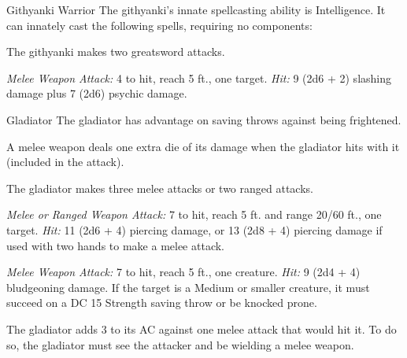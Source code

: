 \documentclass[10pt,a4paper,twoside,bg=print,twocolumn,openany,nodeprecatedcode]{dndbook}
\begin{document}
\begin{DndMonster}[float=t]{Githyanki Warrior}
\DndMonsterBasics[
armor-class = {17 (\textit{half plate armor})},
hit-points = {\DndDice{9d8 + 9}},
speed = {30 ft.}
]
\DndMonsterAbilityScores[
 str = 15,
 dex = 14,
 con = 12,
 int = 13,
 wis = 13,
 cha = 10
]
\DndMonsterDetails[
saving-throws = {Con +3, Int +3, Wis +3},
languages = {Gith},
challenge = 3,
]
The githyanki's innate spellcasting ability is Intelligence. It can innately cast the following spells, requiring no components:
\begin{DndMonsterSpells}
\end{DndMonsterSpells}
The githyanki makes two greatsword attacks.

\textsl{Melee Weapon Attack:} 4 to hit, reach 5 ft., one target. \textsl{Hit:} 9 (2d6 + 2) slashing damage plus 7 (2d6) psychic damage.

\end{DndMonster}



\begin{DndMonster}[float=t]{Gladiator}
\DndMonsterBasics[
armor-class = {16 (studded leather armor)},
hit-points = {\DndDice{15d8 + 45}},
speed = {30 ft.}
]
\DndMonsterAbilityScores[
 str = 18,
 dex = 15,
 con = 16,
 int = 10,
 wis = 12,
 cha = 15
]
\DndMonsterDetails[
saving-throws = {Str +7, Dex +5, Con +6},
skills = {Athletics +10, Intimidation +5},
languages = {any one language (usually Common)},
challenge = 5,
]
The gladiator has advantage on saving throws against being frightened.

A melee weapon deals one extra die of its damage when the gladiator hits with it (included in the attack).

The gladiator makes three melee attacks or two ranged attacks.

\textsl{Melee or Ranged Weapon Attack:} 7 to hit, reach 5 ft. and range 20/60 ft., one target. \textsl{Hit:} 11 (2d6 + 4) piercing damage, or 13 (2d8 + 4) piercing damage if used with two hands to make a melee attack.

\textsl{Melee Weapon Attack:} 7 to hit, reach 5 ft., one creature. \textsl{Hit:} 9 (2d4 + 4) bludgeoning damage. If the target is a Medium or smaller creature, it must succeed on a DC 15 Strength saving throw or be knocked prone.

The gladiator adds 3 to its AC against one melee attack that would hit it. To do so, the gladiator must see the attacker and be wielding a melee weapon.

\end{DndMonster}
\end{document}
